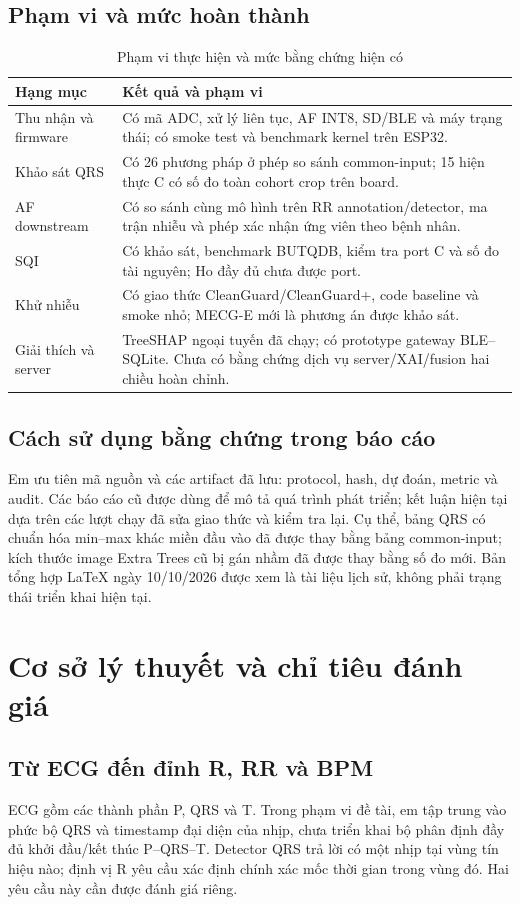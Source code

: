 \documentclass[12pt,a4paper,oneside]{report}
\begin{document}
\section{Phạm vi và mức hoàn thành}
\begin{table}[H]
\centering\small
\caption{Phạm vi thực hiện và mức bằng chứng hiện có}
\begin{tabularx}{\textwidth}{L{3.1cm}X}
\toprule Hạng mục & Kết quả và phạm vi\\\midrule
Thu nhận và firmware & Có mã ADC, xử lý liên tục, AF INT8, SD/BLE và máy trạng thái; có smoke test và benchmark kernel trên ESP32.\\
Khảo sát QRS & Có 26 phương pháp ở phép so sánh common-input; 15 hiện thực C có số đo toàn cohort crop trên board.\\
AF downstream & Có so sánh cùng mô hình trên RR annotation/detector, ma trận nhiễu và phép xác nhận ứng viên theo bệnh nhân.\\
SQI & Có khảo sát, benchmark BUTQDB, kiểm tra port C và số đo tài nguyên; Ho đầy đủ chưa được port.\\
Khử nhiễu & Có giao thức CleanGuard/CleanGuard+, code baseline và smoke nhỏ; MECG-E mới là phương án được khảo sát.\\
Giải thích và server & TreeSHAP ngoại tuyến đã chạy; có prototype gateway BLE--SQLite. Chưa có bằng chứng dịch vụ server/XAI/fusion hai chiều hoàn chỉnh.\\
\bottomrule
\end{tabularx}
\end{table}

\section{Cách sử dụng bằng chứng trong báo cáo}
Em ưu tiên mã nguồn và các artifact đã lưu: protocol, hash, dự đoán, metric và audit. Các báo cáo cũ được dùng để mô tả quá trình phát triển; kết luận hiện tại dựa trên các lượt chạy đã sửa giao thức và kiểm tra lại. Cụ thể, bảng QRS có chuẩn hóa min--max khác miền đầu vào đã được thay bằng bảng common-input; kích thước image Extra Trees cũ bị gán nhầm đã được thay bằng số đo mới. Bản tổng hợp LaTeX ngày 10/10/2026 được xem là tài liệu lịch sử, không phải trạng thái triển khai hiện tại.

\chapter{Cơ sở lý thuyết và chỉ tiêu đánh giá}
\section{Từ ECG đến đỉnh R, RR và BPM}
ECG gồm các thành phần P, QRS và T. Trong phạm vi đề tài, em tập trung vào phức bộ QRS và timestamp đại diện của nhịp, chưa triển khai bộ phân định đầy đủ khởi đầu/kết thúc P--QRS--T. Detector QRS trả lời có một nhịp tại vùng tín hiệu nào; định vị R yêu cầu xác định chính xác mốc thời gian trong vùng đó. Hai yêu cầu này cần được đánh giá riêng.
\end{document}
